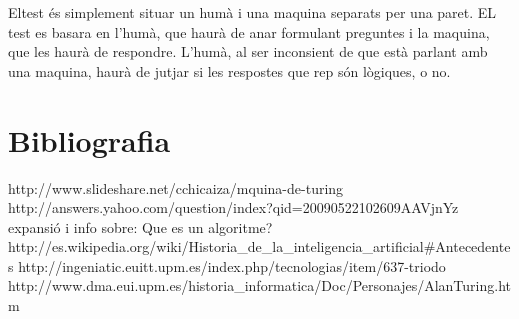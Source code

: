 Eltest és simplement situar un humà i una maquina separats per una paret. EL test es basara en l'humà, que haurà de anar formulant preguntes i la maquina, que les haurà de respondre. L'humà, al ser inconsient de que està parlant amb una maquina, haurà de jutjar si les respostes que rep són lògiques, o no. 




\section{Bibliografia}

http://www.slideshare.net/cchicaiza/mquina-de-turing
http://answers.yahoo.com/question/index?qid=20090522102609AAVjnYz {expansió i info sobre: Que es un algoritme?}
http://es.wikipedia.org/wiki/Historia_de_la_inteligencia_artificial#Antecedentes
http://ingeniatic.euitt.upm.es/index.php/tecnologias/item/637-triodo
http://www.dma.eui.upm.es/historia_informatica/Doc/Personajes/AlanTuring.htm


























